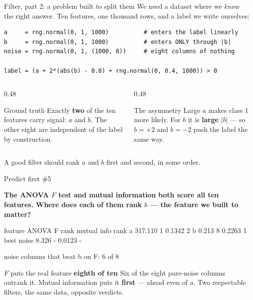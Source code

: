 \documentclass[aspectratio=169]{beamer}
\begin{document}
\begin{frame}[fragile,shrink=6]{Filter, part 2: a problem built to split them}
We need a dataset where we \emph{know} the right answer. Ten features,
one thousand rows, and a label we write ourselves:
\begin{lstlisting}
a     = rng.normal(0, 1, 1000)          # enters the label linearly
b     = rng.normal(0, 1, 1000)          # enters ONLY through |b|
noise = rng.normal(0, 1, (1000, 8))     # eight columns of nothing

label = (a + 2*(abs(b) - 0.8) + rng.normal(0, 0.4, 1000)) > 0
\end{lstlisting}
\vspace{0.2em}
\begin{columns}[T]
  \begin{column}{0.48\textwidth}
    \begin{block}{Ground truth}
      \small Exactly \textbf{two} of the ten features carry signal: $a$ and
      $b$. The other eight are independent of the label by construction.
    \end{block}
  \end{column}
  \begin{column}{0.48\textwidth}
    \begin{exampleblock}{The asymmetry}
      \small Large $a$ makes class 1 more likely. For $b$ it is
      \textbf{large $|b|$} --- so $b = +2$ and $b = -2$ push the label the
      same way.
    \end{exampleblock}
  \end{column}
\end{columns}
\vspace{0.3em}
\begin{center}\small
  A good filter should rank $a$ and $b$ first and second, in some order.
\end{center}
\end{frame}

\begin{frame}[fragile,shrink=8]{Predict first \#5}
\begin{center}
  \textbf{The ANOVA $F$ test and mutual information both score all ten
  features. Where does each of them rank $b$ --- the feature we built to
  matter?}
\end{center}
\vspace{0.3em}
\begin{outblk}
feature             ANOVA F     rank  mutual info     rank
a                   317.110        1       0.1342        2
b                     0.213        8       0.2263        1
best noise            8.326        -       0.0123        -

noise columns that beat b on F: 6 of 8
\end{outblk}
\begin{alertblock}{$F$ puts the real feature \textbf{eighth of ten}}
  \footnotesize Six of the eight pure-noise columns outrank it. Mutual
  information puts it \textbf{first} --- ahead even of $a$. Two respectable
  filters, the same data, opposite verdicts.
\end{alertblock}
\end{frame}
\end{document}
